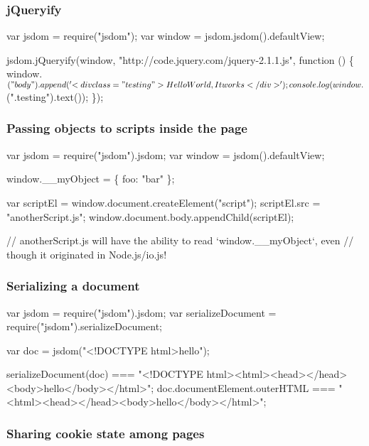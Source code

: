 \subsubsection*{j\+Queryify}


\begin{DoxyCode}
var jsdom = require("jsdom");
var window = jsdom.jsdom().defaultView;

jsdom.jQueryify(window, "http://code.jquery.com/jquery-2.1.1.js", function () \{
  window.$("body").append('<div class="testing">Hello World, It works</div>');

  console.log(window.$(".testing").text());
\});
\end{DoxyCode}


\subsubsection*{Passing objects to scripts inside the page}


\begin{DoxyCode}
var jsdom = require("jsdom").jsdom;
var window = jsdom().defaultView;

window.\_\_myObject = \{ foo: "bar" \};

var scriptEl = window.document.createElement("script");
scriptEl.src = "anotherScript.js";
window.document.body.appendChild(scriptEl);

// anotherScript.js will have the ability to read `window.\_\_myObject`, even
// though it originated in Node.js/io.js!
\end{DoxyCode}


\subsubsection*{Serializing a document}


\begin{DoxyCode}
var jsdom = require("jsdom").jsdom;
var serializeDocument = require("jsdom").serializeDocument;

var doc = jsdom("<!DOCTYPE html>hello");

serializeDocument(doc) === "<!DOCTYPE html><html><head></head><body>hello</body></html>";
doc.documentElement.outerHTML === "<html><head></head><body>hello</body></html>";
\end{DoxyCode}


\subsubsection*{Sharing cookie state among pages}


